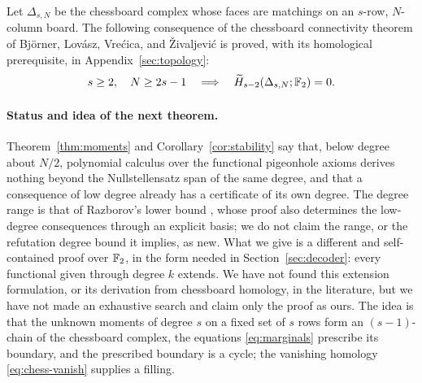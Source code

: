 Let \(\Delta_{s,N}\) be the chessboard complex whose faces are matchings on
an \(s\)-row, \(N\)-column board. The following consequence of the
chessboard connectivity theorem of Bj\"orner, Lov\'asz, Vre\'cica,
and \v{Z}ivaljevi\'c \cite{BLVZ94} is proved, with its homological
prerequisite, in Appendix~\ref{sec:topology}:
\begin{equation}\label{eq:chess-vanish}
 s\ge2,\quad N\ge2s-1
 \quad\Longrightarrow\quad
 \widetilde H_{s-2}(\Delta_{s,N};\mathbb F_2)=0.
\end{equation}

\paragraph{Status and idea of the next theorem.}
Theorem~\ref{thm:moments} and Corollary~\ref{cor:stability} say that, below
degree about \(N/2\), polynomial calculus over the functional pigeonhole
axioms derives nothing beyond the Nullstellensatz span of the same degree,
and that a consequence of low degree already has a certificate of its own
degree. The degree range is that of Razborov's lower bound \cite{Raz98},
whose proof also determines the low-degree consequences through an explicit
basis; we do not claim the range, or the refutation degree bound it implies,
as new. What we give is a different and self-contained proof over \(\mathbb F_2\), in
the form needed in Section~\ref{sec:decoder}: every functional given through
degree \(k\) extends. We have not found this extension formulation, or its
derivation from chessboard homology, in the literature, but we have not
made an exhaustive search and claim only the proof as ours. The idea is
that the unknown moments of degree \(s\) on a fixed set of \(s\) rows form
an \((s-1)\)-chain of the chessboard complex, the equations
\eqref{eq:marginals} prescribe its boundary, and the prescribed boundary is
a cycle; the vanishing homology \eqref{eq:chess-vanish} supplies a filling.

